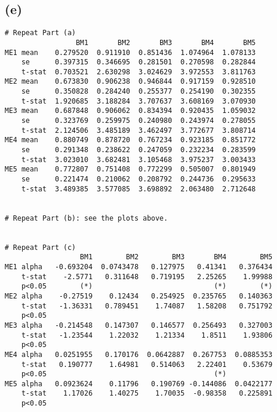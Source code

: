 \documentclass[10pt]{article}
\begin{document}
    \begin{center}
    \end{center}
    
    \subsection{(e)}\label{e}

    \begin{center}
    \end{center}

    \begin{Verbatim}[commandchars=\\\{\}]
# Repeat Part (a)
                 BM1       BM2       BM3       BM4       BM5
ME1 mean    0.279520  0.911910  0.851436  1.074964  1.078133
    se      0.397315  0.346695  0.281501  0.270598  0.282844
    t-stat  0.703521  2.630298  3.024629  3.972553  3.811763
ME2 mean    0.673830  0.906238  0.946844  0.917159  0.928510
    se      0.350828  0.284240  0.255377  0.254190  0.302355
    t-stat  1.920685  3.188284  3.707637  3.608169  3.070930
ME3 mean    0.687848  0.906062  0.834394  0.920435  1.059032
    se      0.323769  0.259975  0.240980  0.243974  0.278055
    t-stat  2.124506  3.485189  3.462497  3.772677  3.808714
ME4 mean    0.880749  0.878720  0.767234  0.923185  0.851772
    se      0.291348  0.238622  0.247059  0.232234  0.283599
    t-stat  3.023010  3.682481  3.105468  3.975237  3.003433
ME5 mean    0.772807  0.751408  0.772299  0.505007  0.801949
    se      0.221474  0.210062  0.208792  0.244736  0.295633
    t-stat  3.489385  3.577085  3.698892  2.063480  2.712648


# Repeat Part (b): see the plots above.


# Repeat Part (c)
                  BM1        BM2        BM3       BM4        BM5
ME1 alpha   -0.693204  0.0743478   0.127975   0.41341   0.376434
    t-stat    -2.5771   0.311648   0.719195   2.25265    1.99988
    p<0.05        (*)                             (*)        (*)
ME2 alpha    -0.27519    0.12434   0.254925  0.235765   0.140363
    t-stat   -1.36331   0.789451    1.74087   1.58208   0.751792
    p<0.05                                                      
ME3 alpha   -0.214548   0.147307   0.146577  0.256493   0.327003
    t-stat   -1.23544    1.22032    1.21334    1.8511    1.93806
    p<0.05                                                      
ME4 alpha   0.0251955   0.170176  0.0642887  0.267753  0.0885353
    t-stat   0.190777    1.64981   0.514063   2.22401    0.53679
    p<0.05                                        (*)           
ME5 alpha   0.0923624    0.11796   0.190769 -0.144086  0.0422177
    t-stat    1.17026    1.40275    1.70035  -0.98358   0.225891
    p<0.05        



\end{Verbatim}
\end{document}
